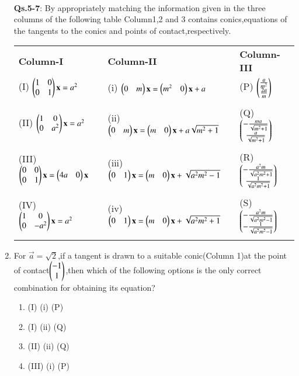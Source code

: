 \documentclass[journal,12pt,twocolumn]{IEEEtran}
\begin{document}
\begin{enumerate}[label=\arabic*]
\begin{tabular}{ c c c c }
\end{tabular}\\
    \textbf{Qs.5-7}: By appropriately matching the information given in the three columns of the following table Column1,2 and 3 contains conics,equations of the tangents to the conics and points of contact,respectively.
    \begin{tabular}{llllll}
    \textbf{Column-I} &\enspace &\textbf{Column-II}&\enspace  &\textbf{Column-III}\\
    (I) $\begin{pmatrix}1&0\\0&1\end{pmatrix}\mathbf{x}=a^2$&\enspace &
    (i) $\begin{pmatrix}0&m\end{pmatrix}\mathbf{x}=\begin{pmatrix}m^2&0\end{pmatrix}\mathbf{x}+a$ &\enspace & 
    (P) $\begin{pmatrix}\frac{a}{m^2}\\\frac{2a}{m}\end{pmatrix}$\\ &&&\\
    (II) $\begin{pmatrix}1&0\\0&a^2\end{pmatrix}\mathbf{x}=a^2$&\enspace &
    (ii) $\begin{pmatrix}0&m\end{pmatrix}\mathbf{x}=\begin{pmatrix}m&0\end{pmatrix}\mathbf{x}+a\sqrt{m^2+1}$ &\enspace &  (Q) $\begin{pmatrix}-\frac{ma}{\sqrt{m^2+1}}\\\frac{a}{\sqrt{m^2+1}}\end{pmatrix}$\\ &&&\\
    (III) $\begin{pmatrix}0&0\\0&1\end{pmatrix}\mathbf{x}=\begin{pmatrix}4a&0\end{pmatrix}\mathbf{x}$&   \enspace   & (iii) $\begin{pmatrix}0&1\end{pmatrix}\mathbf{x}=\begin{pmatrix}m&0\end{pmatrix}\mathbf{x}+\sqrt{a^2m^2-1}$ &\enspace & (R) $\begin{pmatrix}-\frac{a^2m}{\sqrt{a^2m^2+1}}\\\frac{1}{\sqrt{a^2m^2+1}}\end{pmatrix}$\\ &&&\\
    (IV) $\begin{pmatrix}1&0\\0&-a^2\end{pmatrix}\mathbf{x}=a^2$&\enspace & 
    (iv) $\begin{pmatrix}0&1\end{pmatrix}\mathbf{x}=\begin{pmatrix}m&0\end{pmatrix}\mathbf{x}+\sqrt{a^2m^2+1}$ & \enspace & (S) $\begin{pmatrix}-\frac{a^2m}{\sqrt{a^2m^2-1}}\\-\frac{1}{\sqrt{a^2m^2-1}}\end{pmatrix}$\\ &&&\\
    \end{tabular}
    \item For $\vec{a}=\sqrt{2}$,if a tangent is drawn to a suitable conic(Column 1)at the point of contact$\begin{pmatrix}-1\\1\end{pmatrix}$,then which of the following options is the only correct combination for obtaining its equation?
    \begin{enumerate}
    \item (I)  (i)  (P)
    \item (I)  (ii)  (Q)
    \item (II)  (ii)  (Q)
    \item (III)  (i)  (P)

\end{enumerate}
\end{enumerate}
\end{document}
